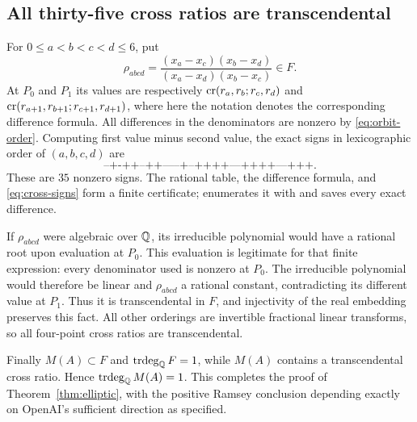 \subsection{All thirty-five cross ratios are transcendental}
For $0\le a<b<c<d\le6$, put
\[
 \rho_{abcd}=
 \frac{(x_a-x_c)(x_b-x_d)}{(x_a-x_d)(x_b-x_c)}\in F.
\]
At $P_0$ and $P_1$ its values are respectively
$\operatorname{cr}(r_a,r_b;r_c,r_d)$ and
$\operatorname{cr}(r_{a+1},r_{b+1};r_{c+1},r_{d+1})$, where here the
notation denotes the corresponding difference formula.
All differences in the denominators are nonzero by
\eqref{eq:orbit-order}. Computing first value minus second value,
the exact signs in lexicographic order of $(a,b,c,d)$ are
\begin{equation}\label{eq:cross-signs}
 \texttt{--+-++--++-----+--++++---++++---+++}.
\end{equation}
These are $35$ nonzero signs. The rational table, the difference
formula, and \eqref{eq:cross-signs} form a finite certificate;
 enumerates it with 
and saves every exact difference.

If $\rho_{abcd}$ were algebraic over $\mathbb Q$, its irreducible
polynomial would have a rational root upon evaluation at $P_0$.
This evaluation is legitimate for that finite expression: every
denominator used is nonzero at $P_0$. The irreducible polynomial
would therefore be linear and $\rho_{abcd}$ a rational constant,
contradicting its different value at $P_1$. Thus it is transcendental
in $F$, and injectivity of the real embedding preserves this fact.
All other orderings are invertible fractional linear transforms,
so all four-point cross ratios are transcendental.

Finally $M(A)\subset F$ and $\operatorname{trdeg}_\mathbb Q F=1$, while $M(A)$ contains
a transcendental cross ratio. Hence $\operatorname{trdeg}_\mathbb Q M(A)=1$.
This completes the proof of Theorem~\ref{thm:elliptic}, with the
positive Ramsey conclusion depending exactly on OpenAI's sufficient
direction as specified.
